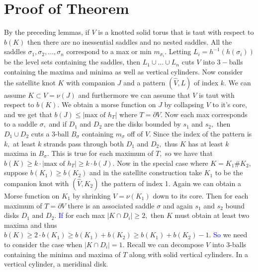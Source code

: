 \documentclass[11pt, oneside]{article}
\begin{document}
\section*{Proof of Theorem}
By the preceding lemmas, if $V$ is a knotted solid torus that is taut with respect to $b(K)$ then there are no inessential saddles and no nested saddles. All the saddles $\sigma_{1}, \sigma_{2}, \hdots, \sigma_{n}$ correspond to a max or min $m_{\sigma_{i}}$. Letting $L_{i} = h^{-1}(h(\sigma_{i}))$ be the level sets containing the saddles, then $L_{1} \cup \hdots \cup L_{n}$ cuts $V$ into $3-$balls containing the maxima and minima as well as vertical cylinders. \newline \newline Now consider the satellite knot $K$ with companion $J$ and a pattern $(\hat{V}, L)$ of index $k.$ We can assume $K \subset V = \nu(J)$ and furthermore we can assume that $V$ is taut with respect to $b(K).$ We obtain a morse function on $J$ by collapsing $V$ to it's core, and we get that $b(J) \leq |\text{max of }h_{T}|$ where $T = \partial V.$ Now each max corresponds to a saddle $\sigma,$ and if $D_{1}$ and $D_{2}$ are the disks bounded by $s_{1}$ and $s_{2},$ then $D_{1} \cup D_{2}$ cuts a $3$-ball $B_{\sigma}$ containing $m_{\sigma}$ off of $V.$ Since the index of the pattern is $k,$ at least $k$ strands pass through both $D_{1}$ and $D_{2},$ thus $K$ has at least $k$ maxima in $B_{\sigma}.$ This is true for each maximum of $T,$ so we have that $b(K) \geq k\cdot |\text{max of }h_{T}| \geq k\cdot b(J).$ \newline \newline Now in the special case where $K = K_{1} \# K_{2},$ suppose $b(K_{1}) \geq b(K_{2})$ and in the satellite construction take $K_{1}$ to be the companion knot with $(\hat{V}, K_{2})$ the pattern of index 1. Again we can obtain a Morse function on $K_{1}$ by shrinking $V = \nu(K_{1})$ down to its core. Then for each maximum of $T = \partial V$ there is an associated saddle $\sigma$ and again $s_{1}$ and $s_{2}$ bound disks $D_{1}$ and $D_{2}.$ \textcolor{blue}{If} for each max $|K \cap D_{i}| \geq 2,$ then $K$ must obtain at least two maxima and thus $b(K) \geq 2\cdot b(K_{1}) \geq b(K_{1}) + b(K_{2}) \geq b(K_{1}) + b(K_{2}) - 1.$ \textcolor{blue}{So} we need to consider the case when $|K \cap D_{i}| = 1.$ Recall we can decompose $V$ into $3$-balls containing the minima and maxima of $T$ along with solid vertical cylinders. In a vertical cylinder, a meridinal disk. 
\end{document}
